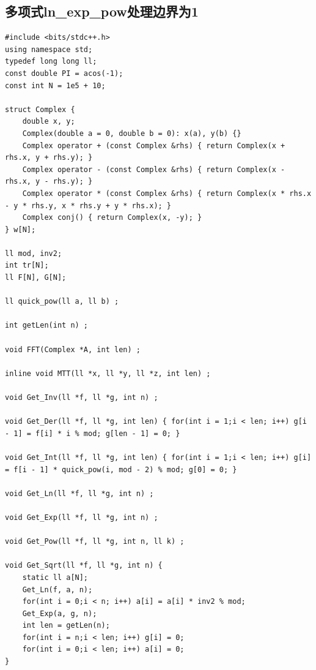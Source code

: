 \documentclass[twoside]{article}
\begin{document}
\subsection{多项式ln_exp_pow处理边界为1}
\begin{lstlisting}
#include <bits/stdc++.h>
using namespace std;
typedef long long ll;
const double PI = acos(-1);
const int N = 1e5 + 10;

struct Complex {
    double x, y;
    Complex(double a = 0, double b = 0): x(a), y(b) {}
    Complex operator + (const Complex &rhs) { return Complex(x + rhs.x, y + rhs.y); }
    Complex operator - (const Complex &rhs) { return Complex(x - rhs.x, y - rhs.y); }
    Complex operator * (const Complex &rhs) { return Complex(x * rhs.x - y * rhs.y, x * rhs.y + y * rhs.x); }
    Complex conj() { return Complex(x, -y); }
} w[N];

ll mod, inv2;
int tr[N];
ll F[N], G[N];

ll quick_pow(ll a, ll b) ;

int getLen(int n) ;

void FFT(Complex *A, int len) ;

inline void MTT(ll *x, ll *y, ll *z, int len) ;

void Get_Inv(ll *f, ll *g, int n) ;

void Get_Der(ll *f, ll *g, int len) { for(int i = 1;i < len; i++) g[i - 1] = f[i] * i % mod; g[len - 1] = 0; }

void Get_Int(ll *f, ll *g, int len) { for(int i = 1;i < len; i++) g[i] = f[i - 1] * quick_pow(i, mod - 2) % mod; g[0] = 0; }

void Get_Ln(ll *f, ll *g, int n) ;

void Get_Exp(ll *f, ll *g, int n) ;

void Get_Pow(ll *f, ll *g, int n, ll k) ;

void Get_Sqrt(ll *f, ll *g, int n) {
    static ll a[N];
    Get_Ln(f, a, n);
    for(int i = 0;i < n; i++) a[i] = a[i] * inv2 % mod;
    Get_Exp(a, g, n);
    int len = getLen(n);
    for(int i = n;i < len; i++) g[i] = 0;
    for(int i = 0;i < len; i++) a[i] = 0;
}

\end{lstlisting}
\end{document}

